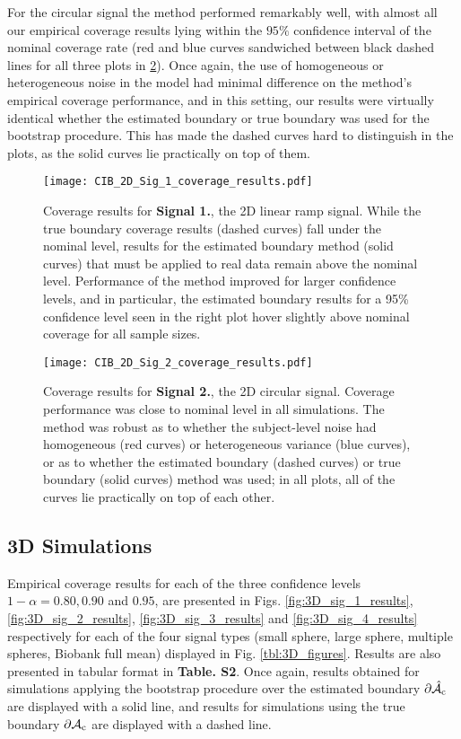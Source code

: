 For the circular signal the method performed remarkably well, with almost all our empirical coverage results lying within the $95\%$ confidence interval of the nominal coverage rate (red and blue curves sandwiched between black dashed lines for all three plots in \ref{fig:2D_sig_2_results}). Once again, the use of homogeneous or heterogeneous noise in the model had minimal difference on the method's empirical coverage performance, and in this setting, our results were virtually identical whether the estimated boundary or true boundary was used for the bootstrap procedure. This has made the dashed curves hard to distinguish in the plots, as the solid curves lie practically on top of them. 

\begin{figure}[htbp]
\hspace*{-1.5cm}
    \texttt{[image: CIB\_2D\_Sig\_1\_coverage\_results.pdf]}
\caption{Coverage results for \textbf{Signal 1.}, the 2D linear ramp signal. While the true boundary coverage results (dashed curves) fall under the nominal level, results for the estimated boundary method (solid curves) that must be applied to real data remain above the nominal level. Performance of the method improved for larger confidence levels, and in particular, the estimated boundary results for a 95\% confidence level seen in the right plot hover slightly above nominal coverage for all sample sizes.}
\label{fig:2D_sig_1_results}
\end{figure}

\begin{figure}[htbp]
\hspace*{-1.5cm}
    \texttt{[image: CIB\_2D\_Sig\_2\_coverage\_results.pdf]}
\caption{Coverage results for \textbf{Signal 2.}, the 2D circular signal. Coverage performance was close to nominal level in all simulations. The method was robust as to whether the subject-level noise had homogeneous (red curves) or heterogeneous variance (blue curves), or as to whether the estimated boundary (dashed curves) or true boundary (solid curves) method was used; in all plots, all of the curves lie practically on top of each other.}
\label{fig:2D_sig_2_results}
\end{figure}

\subsection{3D Simulations}
\label{sec:3D_simulation_results}

Empirical coverage results for each of the three confidence levels $1 - \alpha = 0.80, 0.90$ and $0.95$, are presented in Figs. \ref{fig:3D_sig_1_results}, \ref{fig:3D_sig_2_results}, \ref{fig:3D_sig_3_results} and \ref{fig:3D_sig_4_results} respectively for each of the four signal types (small sphere, large sphere, multiple spheres, Biobank full mean) displayed in Fig. \ref{tbl:3D_figures}. Results are also presented in tabular format in \textbf{Table. S2}. Once again, results obtained for simulations applying the bootstrap procedure over the estimated boundary $\operatorname{\partial\hat{\mathcal{A}}_{c}}$ are displayed with a solid line, and results for simulations using the true boundary $\operatorname{\partial\mathcal{A}_{c}}$ are displayed with a dashed line.

